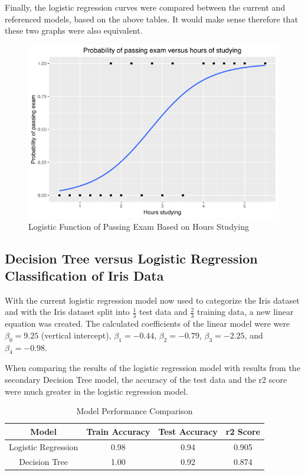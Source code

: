 \documentclass[journal]{IEEEtran}
\begin{document}
\vspace{10px}
Finally, the logistic regression curves were compared between the current and referenced models, based on the above tables. It would make sense therefore that these two graphs were also equivalent.

\begin{figure}[h!]
\includegraphics[scale=0.4]{wikiPassingExams.png}
\centering
\caption{Logistic Function of Passing Exam Based on Hours Studying}
\label{fig:wikilogfunction}
\end{figure}

\subsection{Decision Tree versus Logistic Regression Classification of Iris Data}

With the current logistic regression model now used to categorize the Iris dataset and with the Iris dataset split into \(\frac{1}{3}\) test data and \(\frac{2}{3}\) training data, a new linear equation was created. The calculated coefficients of the linear model were were $\beta_0 = 9.25$ (vertical intercept), $\beta_1 = -0.44$, $\beta_2 = -0.79$, $\beta_3 = -2.25$, and $\beta_4 = -0.98$.

When comparing the results of the logistic regression model with results from the secondary Decision Tree model, the accuracy of the test data and the r2 score were much greater in the logistic regression model. 

\begin{table}[h!]
\centering
\begin{tabular}{ c | c c c }
Model & Train Accuracy & Test Accuracy & r2 Score \\ 
\hline
Logistic Regression	& 0.98	& 0.94	& 0.905 \\
Decision Tree & 	1.00	& 0.92	& 0.874
\end{tabular}
\caption{Model Performance Comparison}
\label{table:model-comparison-table}
\end{table}
\end{document}
